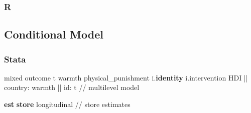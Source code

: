 \documentclass[
  letterpaper,
  DIV=11,
  numbers=noendperiod]{scrreprt}
\newenvironment{Shaded}{\begin{snugshade}}{\end{snugshade}}
\newcommand{\CommentTok}[1]{\textcolor[rgb]{0.37,0.37,0.37}{#1}}
\newcommand{\KeywordTok}[1]{\textcolor[rgb]{0.00,0.23,0.31}{\textbf{#1}}}
\newcommand{\NormalTok}[1]{\textcolor[rgb]{0.00,0.23,0.31}{#1}}
\begin{document}
\subsubsection{R}

\subsection{Conditional Model}\label{conditional-model-1}

\subsubsection{Stata}

\begin{Shaded}
\begin{Highlighting}[]

\NormalTok{mixed outcome t warmth physical\_punishment i.}\KeywordTok{identity}\NormalTok{ i.intervention HDI || country: warmth || id: t }\CommentTok{// multilevel model}

\KeywordTok{est} \KeywordTok{store}\NormalTok{ longitudinal }\CommentTok{// store estimates}
\end{Highlighting}
\end{Shaded}
\end{document}

